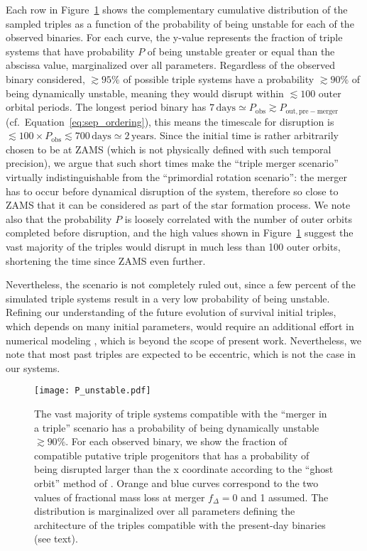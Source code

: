 \documentclass{aa}
\DeclareRobustCommand{\Eqref}[1]{Equation~\ref{#1}}
\DeclareRobustCommand{\Figref}[1]{Figure~\ref{#1}}
\begin{document}
 Each row in \Figref{fig:ML_stability} shows the complementary
 cumulative distribution of the sampled triples as a function of the
 probability of being unstable for each of the observed binaries. For
 each curve, the y-value represents the fraction of triple systems
 that have probability $P$ of being unstable greater or equal than the
 abscissa value, marginalized over all parameters. Regardless of the
 observed binary considered, $\gtrsim 95\%$ of possible triple systems
 have a probability $\gtrsim 90\%$ of being dynamically unstable,
 meaning they would disrupt within $\lesssim100$ outer orbital periods.
 The longest period binary has
 $7\,\mathrm{days}\simeq P_\mathrm{obs}\gtrsim P_\mathrm{out, pre-merger}$
 (cf.~\Eqref{eq:sep_ordering}), this means the timescale for
 disruption is
 $\lesssim 100\times P_\mathrm{obs} \lesssim 700\,\mathrm{days}\simeq 2\,\mathrm{years}$.
 Since the initial time is rather arbitrarily chosen to be at ZAMS
 (which is not physically defined with such temporal precision), we
 argue that such short times make the ``triple merger scenario''
 virtually indistinguishable from the ``primordial rotation
 scenario'': the merger has to occur before dynamical disruption of
 the system, therefore so close to ZAMS that it can be considered as
 part of the star formation process. We note also that the probability
 $P$ is loosely correlated with the number of outer orbits completed
 before disruption, and the high values shown in
 \Figref{fig:ML_stability} suggest the vast majority of the triples
 would disrupt in much less than 100 outer orbits, shortening the time
 since ZAMS even further.

 Nevertheless, the scenario is not completely ruled out, since a few
 percent of the simulated triple systems result in a very low
 probability of being unstable.
Refining our understanding of the future evolution of survival initial triples, which depends on many initial parameters, would require an additional effort in numerical modeling \citep[e.g.][]{toonen:20,Dorozsmai_2024}, which is beyond the scope of present work.
Nevertheless, we note that most past triples are expected to be eccentric, which is not the case in our systems.

 \begin{figure}[htbp]
   \texttt{[image: P\_unstable.pdf]}
   \caption{The vast majority of triple systems compatible with the
     ``merger in a triple'' scenario has a probability of being
     dynamically unstable $\gtrsim90\%$. For each observed binary, we
     show the fraction of compatible putative triple progenitors that
     has a probability of being disrupted larger than the x coordinate
     according to the ``ghost orbit'' method of \cite{vynatheya:23}.
     Orange and blue curves correspond to the two values of fractional
     mass loss at merger $f_\Delta=0$ and 1 assumed. The distribution
     is marginalized over all parameters defining the architecture of
     the triples compatible with the present-day binaries (see text).}
   \label{fig:ML_stability}

 \end{figure}
\end{document}
